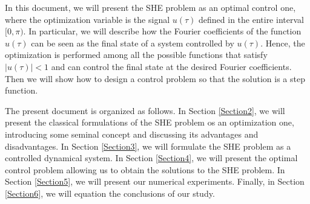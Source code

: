 In this document, we will present the SHE problem as an optimal control one, where the optimization variable is the signal $u(\tau)$ defined in the entire interval $[0,\pi)$. 
%
In particular, we will describe how the Fourier coefficients of the function $u(\tau)$ can be seen as the final state of a system controlled by $u (\tau)$. Hence, the optimization is performed among all the possible functions that satisfy $|u(\tau)|<1 $ and can control the final state at the desired Fourier coefficients. Then we will show how to design a control problem so that the solution is a step function.

The present document is organized as follows. In Section \ref{Section2}, we will present the classical formulations of the SHE problem os an optimization one, introducing some seminal concept and discussing its advantages and disadvantages. In Section \ref{Section3}, we will formulate the SHE problem as a controlled dynamical system. In Section \ref{Section4}, we will present the optimal control problem allowing us to obtain the solutions to the SHE problem. In Section \ref{Section5}, we will present our numerical experiments. Finally, in Section \ref{Section6}, we will equation the conclusions of our study. 
